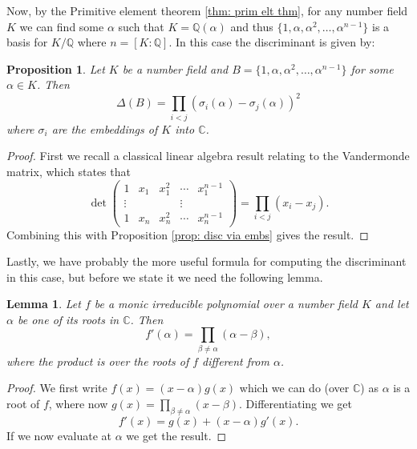 \documentclass[11pt,a4paper]{report}
\theoremstyle{plain}
\newtheorem{lem}[subsection]{Lemma}
\newtheorem{prop}[subsection]{Proposition}
\theoremstyle{definition}
\theoremstyle{definition}
\def\CC{\mathbb{C}}
\def\QQ{\mathbb{Q}}
\def \a{\alpha}
\begin{document}
	Now, by the Primitive element theorem \ref{thm: prim elt thm}, for any number field $K$ we can find some $\a$ such that $K=\QQ(\a)$ and thus $\{1,\a,\a^2,\dots,\a^{n-1}\}$ is a basis for $K/\QQ$ where $n=[K:\QQ]$. In this case the discriminant is given by:
	
	\begin{prop}\label{prop: disc of prim elt basis}
		Let $K$ be a number field and $B=\{1,\a,\a^2,\dots,\a^{n-1}\}$ for some $\a \in K$. Then \[\Delta(B)=\prod_{i < j} (\sigma_i(\a)-\sigma_j(\a))^2\] where $\sigma_i$ are the embeddings of $K $ into $\CC$.
	\end{prop}
	
	\begin{proof}
		First we recall a classical linear algebra result relating to the Vandermonde matrix, which states that  \[\det \left (\begin{matrix} 1 & x_1& x_1^2&\cdots&x_1^{n-1} \\ \vdots & & & \vdots \\   1 & x_n& x_n^2&\cdots&x_n^{n-1}
		\end{matrix} \right ) =\prod_{i<j} (x_i-x_j).\] Combining this with Proposition \ref{prop: disc via embs} gives the result.
	\end{proof}
	
	
	
	
	Lastly, we have probably the more useful formula for computing the discriminant in this case, but before we state it we need the following lemma.
	
	\begin{lem}\label{lem: diff of irr pol}
		Let $f$ be a monic irreducible polynomial over a number field $K$ and let $\a$ be one of its roots in $\CC$. Then \[f'(\a)=\prod_{\beta \neq \a} (\a-\beta),  \] where the product is over the roots of $f$ different from $\a$.
	\end{lem}
	
	\begin{proof}
		We first write $f(x)=(x-\a)g(x)$ which we can do (over $\CC$) as $\a$ is a root of $f$, where now $g(x)=\prod_{\beta \neq \a} (x-\beta)$. Differentiating we get \[f'(x)=g(x)+(x-\a)g'(x).\] If we now evaluate at $\a$ we get the result.
	\end{proof}
	
\end{document}
